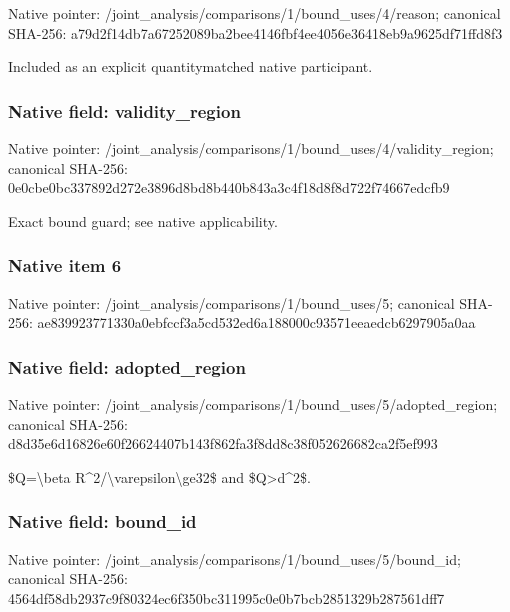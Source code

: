 \documentclass[10pt,a4paper]{article}
\begin{document}
Native pointer: /joint\_analysis/comparis\allowbreak{}ons/1/bound\_uses/4/reaso\allowbreak{}n; canonical SHA-256: a79d2f14db7a67252089ba2b\allowbreak{}ee4146fbf4ee4056e36418eb\allowbreak{}9a9625df71ffd8f3


Included as an explicit quantitymatched native participant.


\subsubsection{Native field: validity\_region}


Native pointer: /joint\_analysis/comparis\allowbreak{}ons/1/bound\_uses/4/valid\allowbreak{}ity\_region; canonical SHA-256: 0e0cbe0bc337892d272e3896\allowbreak{}d8bd8b440b843a3c4f18d8f8\allowbreak{}d722f74667edcfb9


Exact bound guard; see native applicability.


\subsubsection{Native item 6}


Native pointer: /joint\_analysis/comparis\allowbreak{}ons/1/bound\_uses/5; canonical SHA-256: ae839923771330a0ebfccf3a\allowbreak{}5cd532ed6a188000c93571ee\allowbreak{}aedcb6297905a0aa



\subsubsection{Native field: adopted\_region}


Native pointer: /joint\_analysis/comparis\allowbreak{}ons/1/bound\_uses/5/adopt\allowbreak{}ed\_region; canonical SHA-256: d8d35e6d16826e60f2662440\allowbreak{}7b143f862fa3f8dd8c38f052\allowbreak{}626682ca2f5ef993


\$Q=\textbackslash{}beta R\textasciicircum{}2/\textbackslash{}varepsilon\textbackslash{}ge32\$ and \$Q>d\textasciicircum{}2\$.


\subsubsection{Native field: bound\_id}


Native pointer: /joint\_analysis/comparis\allowbreak{}ons/1/bound\_uses/5/bound\allowbreak{}\_id; canonical SHA-256: 4564df58db2937c9f80324ec\allowbreak{}6f350bc311995c0e0b7bcb28\allowbreak{}51329b287561dff7
\end{document}

